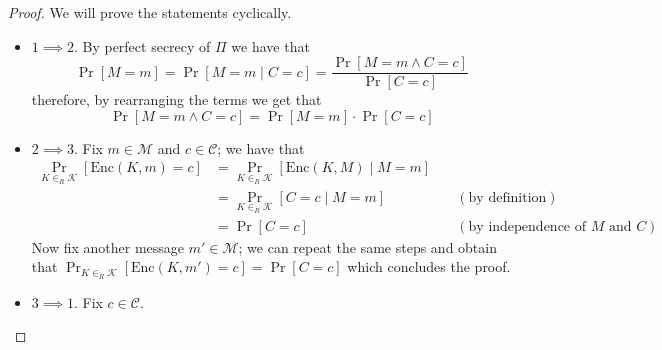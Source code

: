 \documentclass[a4paper, 12pt]{report}
\begin{document}
\begin{proof}
	We will prove the statements cyclically.

	\begin{itemize}
		\item $1 \implies 2$. By perfect secrecy of $\Pi$ we have that $$\Pr[M = m] = \Pr[M = m \mid C = c] = \dfrac{\Pr[M = m \land C = c]}{\Pr[C = c]}$$ therefore, by rearranging the terms we get that $$\Pr[M = m \land C = c] = \Pr[M = m] \cdot \Pr[C = c]$$
		\item $2 \implies 3$. Fix $m \in \mathcal M$ and $c \in \mathcal C$; we have that
		      \begin{equation*}
			      \begin{alignedat}{2}
				      \Pr_{K \in_R \mathcal K}[\mathrm{Enc}(K, m) = c] & = \Pr_{K \in_R \mathcal K}[\mathrm{Enc}(K, M) \mid M = m] &                                               \\
				                                                       & = \Pr_{K \in_R \mathcal K}[C = c \mid M = m]              & \quad (\mbox{by definition})                  \\
				                                                       & = \Pr[C = c]                                              & \quad (\mbox{by independence of $M$ and $C$})
			      \end{alignedat}
		      \end{equation*}
		      Now fix another message $m' \in \mathcal M$; we can repeat the same steps and obtain that $\Pr_{K \in_R \mathcal K}[\mathrm{Enc}(K, m') = c] = \Pr[C = c]$ which concludes the proof.
		\item $3 \implies 1$. Fix $c \in \mathcal C$.


\end{itemize}
\end{proof}
\end{document}
